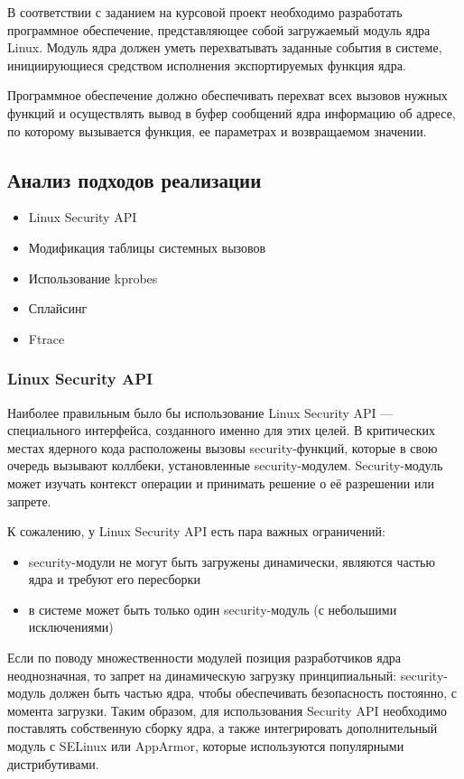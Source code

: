 \documentclass[a4paper,14pt]{extarticle}
\begin{document}
 	В соответствии с заданием на курсовой проект необходимо разработать программное обеспечение, представляющее собой загружаемый модуль ядра Linux. Модуль ядра должен уметь перехватывать заданные события в системе, инициирующиеся средством исполнения экспортируемых функция ядра.
 	
 	Программное обеспечение должно обеспечивать перехват всех вызовов нужных функций и осуществлять вывод в буфер сообщений ядра информацию об адресе, по которому вызывается функция, ее параметрах и возвращаемом значении.
 	
 	\subsection{Анализ подходов реализации}
 	
 	\begin{itemize}
 		\item Linux Security API
 		\item Модификация таблицы системных вызовов
 		\item Использование kprobes
 		\item Сплайсинг
 		\item Ftrace
 	\end{itemize}
 
 	\subsubsection{Linux Security API}
 	
 	Наиболее правильным было бы использование Linux Security API — специального интерфейса, созданного именно для этих целей. В критических местах ядерного кода расположены вызовы security-функций, которые в свою очередь вызывают коллбеки, установленные security-модулем. Security-модуль может изучать контекст операции и принимать решение о её разрешении или запрете.
 	
 	К сожалению, у Linux Security API есть пара важных ограничений:
 	\begin{itemize}
 		\item security-модули не могут быть загружены динамически, являются частью ядра и требуют его пересборки
 		\item в системе может быть только один security-модуль (с небольшими исключениями)
 	\end{itemize}
 	
 	Если по поводу множественности модулей позиция разработчиков ядра неоднозначная, то запрет на динамическую загрузку принципиальный: security-модуль должен быть частью ядра, чтобы обеспечивать безопасность постоянно, с момента загрузки. Таким образом, для использования Security API необходимо поставлять собственную сборку ядра, а также интегрировать дополнительный модуль с SELinux или AppArmor, которые используются популярными дистрибутивами.
 	
\end{document}
